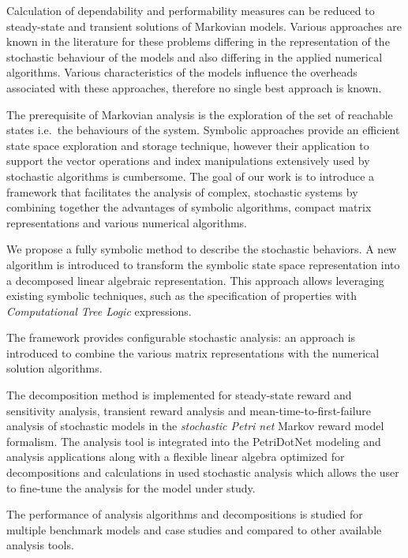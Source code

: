 Calculation of dependability and performability measures can be
reduced to steady-state and transient solutions of Markovian
models. Various approaches are known in the literature for these
problems differing in the representation of the stochastic behaviour
of the models and also differing in the applied numerical
algorithms. Various characteristics of the models influence the
overheads associated with these approaches, therefore no single best
approach is known.

The prerequisite of Markovian analysis is the exploration of the set
of reachable states i.e.~the behaviours of the system. Symbolic
approaches provide an efficient state space exploration and storage
technique, however their application to support the vector operations
and index manipulations extensively used by stochastic algorithms is
cumbersome.  The goal of our work is to introduce a framework that
facilitates the analysis of complex, stochastic systems by combining together the advantages of symbolic algorithms, compact matrix representations and various numerical algorithms.

We propose a fully symbolic method to describe the stochastic behaviors. A new algorithm is introduced to transform the symbolic
state space representation into a decomposed linear algebraic
representation. This approach allows leveraging existing symbolic
techniques, such as the specification of
properties with \emph{Computational Tree Logic} 
expressions.

The framework provides configurable stochastic analysis: an approach is introduced to combine the various matrix representations with the numerical solution algorithms. 

The decomposition method is implemented for steady-state reward and
sensitivity analysis, transient reward analysis and
mean-time-to-first-failure analysis of stochastic models in the
\emph{stochastic Petri net}  Markov reward model
formalism. The analysis tool is integrated into the PetriDotNet
modeling and analysis applications along with a flexible linear
algebra optimized for decompositions and calculations in used
stochastic analysis which allows the user to fine-tune the analysis
for the model under study.

The performance of analysis algorithms and decompositions is studied
for multiple benchmark models and case studies and compared to other
available analysis tools.
